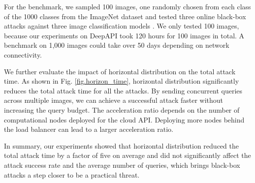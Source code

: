For the benchmark, we sampled 100 images, one randomly chosen from each class of the 1000 classes from the ImageNet dataset and tested three online black-box attacks against three image classification models \citep{chollet2015keras}. We only tested 100 images,  because our experiments on DeepAPI took 120 hours for 100 images in total. A benchmark on 1,000 images could take over 50 days depending on network connectivity.



We further evaluate the impact of horizontal distribution on the total attack time. As shown in Fig. \ref{fig.horizon_time}, horizontal distribution significantly reduces the total attack time for all the attacks. By sending concurrent queries across multiple images, we can achieve a successful attack faster without increasing the query budget. The acceleration ratio depends on the number of computational nodes deployed for the cloud API. Deploying more nodes behind the load balancer can lead to a larger acceleration ratio.


In summary, our experiments showed that horizontal distribution reduced the total attack time by a factor of five on average and did not significantly affect the attack success rate and the average number of queries, which brings black-box attacks a step closer to be a practical threat.

